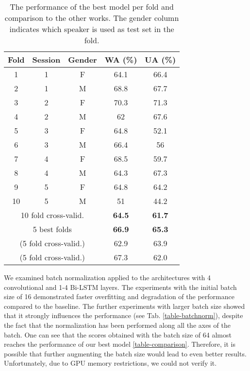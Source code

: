 \documentclass[a4paper]{article}
\begin{document}
\begin{table}[!htb]
\caption{The performance of the best model per fold and comparison to the other works. The gender column indicates which speaker is used as test set in the fold.}
\label{table-folds}
\centering
\begin{tabular}{ccccc}
\toprule
Fold & Session   & Gender & WA (\%) & UA (\%)\\
\midrule
1 & 1 & F & 64.1 & 66.4\\
\rowcolor{mygray} 2 & 1 & M & 68.8 & 67.7\\
3 & 2 & F & 70.3 & 71.3\\
\rowcolor{mygray} 4 & 2 & M & 62 & 67.6\\
5 & 3 & F & 64.8 & 52.1\\
\rowcolor{mygray} 6 & 3 & M & 66.4 & 56\\
7 & 4 & F & 68.5 & 59.7\\
\rowcolor{mygray} 8 & 4 & M & 64.3 & 67.3\\
9 & 5 & F & 64.8 & 64.2\\
\rowcolor{mygray} 10 & 5 & M & 51 & 44.2\\
\multicolumn{3}{c}{10 fold cross-valid.} & \textbf{64.5} & \textbf{61.7}\\
\multicolumn{3}{c}{5 best folds} & \textbf{66.9} & \textbf{65.3}\\
\multicolumn{3}{c}{\cite{microsoft} (5 fold cross-valid.)} & 62.9 & 63.9\\
\multicolumn{3}{c}{\cite{tspredictor} (5 fold cross-valid.)} & 67.3 & 62.0\\
\bottomrule
\end{tabular}
\end{table} 

We examined batch normalization applied to the architectures with 4 convolutional and 1-4 Bi-LSTM layers. 
The experiments with the initial batch size of 16 demonstrated faster overfitting and degradation of the performance compared to the baseline. 
The further experiments with larger batch size showed that it strongly influences the performance (see Tab. \ref{table-batchnorm}), despite the fact that the normalization 
has been performed along all the axes of the batch. One can see that the scores obtained with the batch size of 64 almost reaches the performance of our best model \ref{table-comparison}.  
Therefore, it is possible that further augmenting the batch size would lead to even better results. Unfortunately, due to GPU memory restrictions, we could not verify it. 
\end{document}
